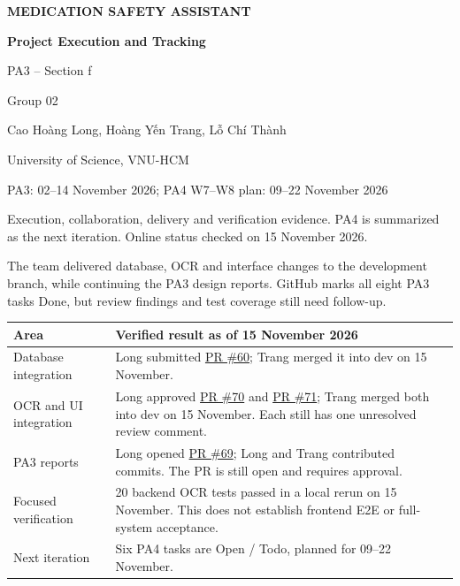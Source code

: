 \documentclass[14pt,a4paper,landscape]{extarticle}
\newcommand{\reportpage}[1]{\clearpage{\Large\bfseries #1\par}\vspace{3mm}}
\newcommand{\pr}[1]{\href{https://github.com/hyt2434/Medical_Safety_Assistant/pull/#1}{PR \##1}}
\begin{document}
\thispagestyle{empty}
\begin{center}
\vspace*{10mm}
{\large\bfseries MEDICATION SAFETY ASSISTANT\par}
\vspace{18mm}
{\fontsize{25}{30}\selectfont\bfseries Project Execution and Tracking\par}
\vspace{5mm}PA3 -- Section f\par
\vspace{8mm}Group 02\par
\vfill
Cao Hoàng Long, Hoàng Yến Trang, Lỗ Chí Thành\par
University of Science, VNU-HCM\par
PA3: 02--14 November 2026; PA4 W7--W8 plan: 09--22 November 2026\par
\vspace{5mm}
\begin{minipage}{.87\linewidth}\centering
Execution, collaboration, delivery and verification evidence. PA4 is summarized as the next iteration. Online status checked on 15 November 2026.
\end{minipage}
\end{center}

\reportpage{1. Execution summary}
The team delivered database, OCR and interface changes to the development branch, while continuing the PA3 design reports. GitHub marks all eight PA3 tasks Done, but review findings and test coverage still need follow-up.

\begin{tabularx}{\linewidth}{@{}p{53mm}X@{}}\toprule
\textbf{Area} & \textbf{Verified result as of 15 November 2026}\\\midrule
Database integration & Long submitted \pr{60}; Trang merged it into dev on 15 November.\\
OCR and UI integration & Long approved \pr{70} and \pr{71}; Trang merged both into dev on 15 November. Each still has one unresolved review comment.\\
PA3 reports & Long opened \pr{69}; Long and Trang contributed commits. The PR is still open and requires approval.\\
Focused verification & 20 backend OCR tests passed in a local rerun on 15 November. This does not establish frontend E2E or full-system acceptance.\\
Next iteration & Six PA4 tasks are Open / Todo, planned for 09--22 November.\\\bottomrule
\end{tabularx}
\end{document}

